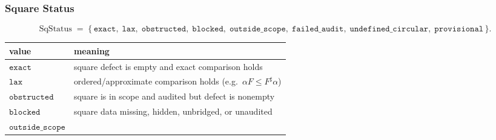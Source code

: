 \documentclass[11pt]{article}
\theoremstyle{definition}
\begin{document}
\subsubsection{Square Status}

\[
\mathrm{SqStatus}\;=\;\{\,\texttt{exact},\;\texttt{lax},\;\texttt{obstructed},\;\texttt{blocked},\;\texttt{outside\_scope},\;\texttt{failed\_audit},\;\texttt{undefined\_circular},\;\texttt{provisional}\,\}.
\]

\begin{longtable}[]{@{}ll@{}}
\toprule
\begin{minipage}[b]{0.28\columnwidth}\raggedright
value\strut
\end{minipage} & \begin{minipage}[b]{0.66\columnwidth}\raggedright
meaning\strut
\end{minipage}\tabularnewline
\midrule
\endhead
\begin{minipage}[t]{0.28\columnwidth}\raggedright
\(\texttt{exact}\)\strut
\end{minipage} & \begin{minipage}[t]{0.66\columnwidth}\raggedright
square defect is empty and exact comparison holds\strut
\end{minipage}\tabularnewline
\begin{minipage}[t]{0.28\columnwidth}\raggedright
\(\texttt{lax}\)\strut
\end{minipage} & \begin{minipage}[t]{0.66\columnwidth}\raggedright
ordered/approximate comparison holds (e.g.~\(\alpha F\le F^{\sharp}\alpha\))\strut
\end{minipage}\tabularnewline
\begin{minipage}[t]{0.28\columnwidth}\raggedright
\(\texttt{obstructed}\)\strut
\end{minipage} & \begin{minipage}[t]{0.66\columnwidth}\raggedright
square is in scope and audited but defect is nonempty\strut
\end{minipage}\tabularnewline
\begin{minipage}[t]{0.28\columnwidth}\raggedright
\(\texttt{blocked}\)\strut
\end{minipage} & \begin{minipage}[t]{0.66\columnwidth}\raggedright
square data missing, hidden, unbridged, or unaudited\strut
\end{minipage}\tabularnewline
\begin{minipage}[t]{0.28\columnwidth}\raggedright
\(\texttt{outside\_scope}\)\strut

\end{minipage}
\end{longtable}
\end{document}
